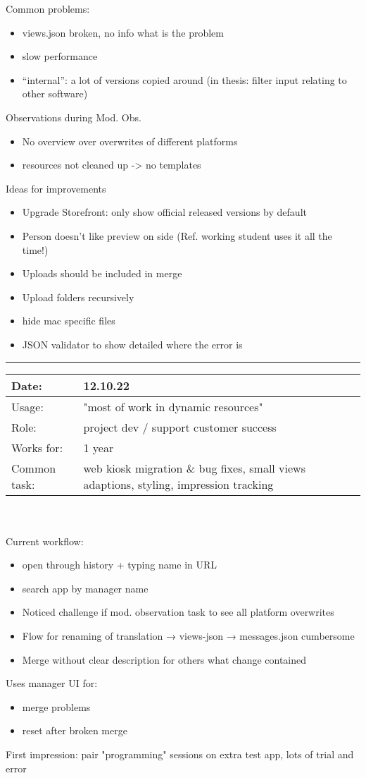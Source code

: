 Common problems:
\begin{itemize}[nosep]
  \item views.json broken, no info what is the problem
  \item slow performance
  \item “internal”: a lot of versions copied around (in thesis: filter input relating to other software)
\end{itemize}

Observations during Mod. Obs.
\begin{itemize}[nosep]
  \item No overview over overwrites of different platforms
  \item resources not cleaned up -> no templates
\end{itemize}

Ideas for improvements
\begin{itemize}[nosep]
  \item Upgrade Storefront: only show official released versions by default
  \item Person doesn't like preview on side (Ref. working student uses it all the time!)
  \item Uploads should be included in merge
  \item Upload folders recursively
  \item hide mac specific files
  \item JSON validator to show detailed where the error is
\end{itemize}
\bigskip
\hrule

\begin{tabularx}{\linewidth}{lX}
  Date: & 12.10.22 \\
  \hline
  Usage: & "most of work in dynamic resources"\\
  \hline
  Role: & project dev / support customer success \\
  \hline
  Works for: & 1 year \\
  \hline
  Common task: &  web kiosk migration \& bug fixes, small views adaptions, styling, impression tracking
\end{tabularx}
\\\\
Current workflow:
\begin{itemize}[nosep]
  \item open through history + typing name in URL
  \item search app by manager name
  \item Noticed challenge if mod. observation task to see all platform overwrites
  \item Flow for renaming of translation → views-json → messages.json cumbersome
  \item Merge without clear description for others what change contained
\end{itemize}
Uses manager UI for:
\begin{itemize}[nosep]
  \item merge problems
  \item reset after broken merge
\end{itemize}
First impression: pair "programming" sessions on extra test app, lots of trial and error

